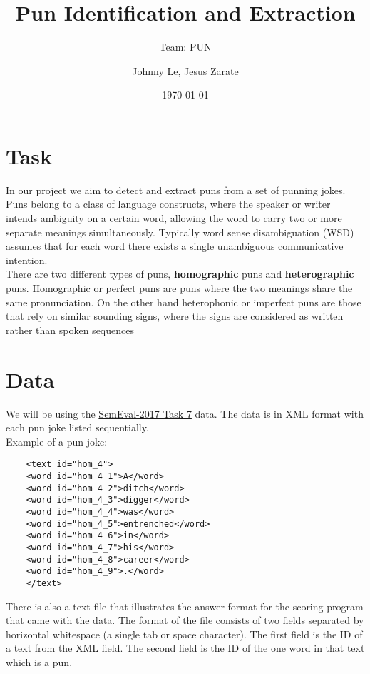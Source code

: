 \documentclass[11pt]{article}
\title{Pun Identification and Extraction}
\author{Team: PUN}
\author{Johnny Le, Jesus Zarate}
\date{\today}
\begin{document}
\maketitle


\section{Task}

In our project we aim to detect and extract puns from a set of punning jokes. Puns
belong to a class of language constructs, where the speaker or writer intends ambiguity
on a certain word, allowing the word to carry two or more separate meanings
simultaneously.
Typically word sense disambiguation \big(WSD\big) assumes that for each
 word there exists a single unambiguous communicative intention.\\

\noindent There are two different types of puns, {\textbf{homographic} } puns and {\textbf{heterographic} } puns.
Homographic or perfect puns are puns where the two meanings share the same pronunciation.
On the other hand heterophonic or imperfect puns are those that rely on similar sounding
signs, where the signs are considered as written rather than spoken sequences




\section{Data}\label{sec:data}

We will be using the
\href{http://alt.qcri.org/semeval2017/task7/}{SemEval-2017 Task 7}
data.
The data is in XML format with each pun joke listed sequentially.\\

Example of a pun joke:\\

\begin{lstlisting}
    <text id="hom_4">
    <word id="hom_4_1">A</word>
    <word id="hom_4_2">ditch</word>
    <word id="hom_4_3">digger</word>
    <word id="hom_4_4">was</word>
    <word id="hom_4_5">entrenched</word>
    <word id="hom_4_6">in</word>
    <word id="hom_4_7">his</word>
    <word id="hom_4_8">career</word>
    <word id="hom_4_9">.</word>
    </text>
\end{lstlisting}

\noindent There is also a text file that illustrates the answer format for the scoring program that came with the data.
The format of the file consists of two fields separated by horizontal whitespace
(a single tab or space character).
The first field is the ID of a text from the XML field.
The second field is the ID of the one word in that text which is a pun.\\
\end{document}
